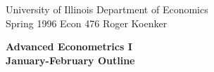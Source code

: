 \setlength{\textwidth}{170mm}
\setlength{\textheight}{220mm}
\setlength{\oddsidemargin}{0mm}
\setlength{\evensidemargin}{10mm}
\setlength{\topmargin}{-10mm}
\def\RR{\hbox{\raise.4ex\hbox{$\scriptstyle{|}$}\hskip-1.85pt R}}
\newcommand{\REF}{\nopagebreak\noindent{\large{\bf
      References}}\vspace{.2in}}

\newcommand{\Ref}[1]{\medskip\noindent\hangafter=1
      \hangindent=20pt\ignorespaces #1}
\pagestyle{empty}



\noindent
University of Illinois \hfill Department of Economics \\
Spring 1996 \hfill Econ 476 \hfill Roger Koenker

\begin{center}
\large{
{\bf Advanced Econometrics I \\
January-February Outline}}
\end{center}

